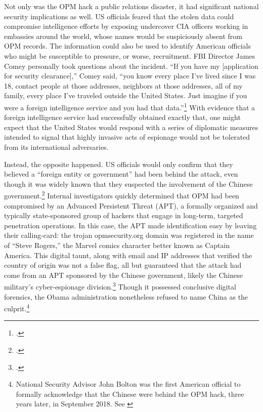 \documentclass[14pt]{extarticle}
\begin{document}
Not only was the OPM hack a public relations disaster, it had significant national security implications as well. US officials feared that the stolen data could compromise intelligence efforts by exposing undercover CIA officers working in embassies around the world, whose names would be suspiciously absent from OPM records. The information could also be used to identify American officials who might be susceptible to pressure, or worse, recruitment. FBI Director James Comey personally took questions about the incident. ``If you have my [application for security clearance],'' Comey said, ``you know every place I've lived since I was 18, contact people at those addresses, neighbors at those addresses, all of my family, every place I've traveled outside the United States. Just imagine if you were a foreign intelligence service and you had that data.''\footcite{nakashima_hacks_2015} With evidence that a foreign intelligence service had successfully obtained exactly that, one might expect that the United States would respond with a series of diplomatic measures intended to signal that highly invasive acts of espionage would not be tolerated from its international adversaries.

Instead, the opposite happened. US officials would only confirm that they believed a \enquote{foreign entity or government} had been behind the attack, even though it was widely known that they suspected the involvement of the Chinese government.\footcite{spetalnick_china_2015} Internal investigators quickly determined that OPM had been compromised by an Advanced Persistent Threat (APT), a formally organized and typically state-sponsored group of hackers that engage in long-term, targeted penetration operations. In this case, the APT made identification easy by leaving their calling-card: the trojan opmsecurity.org domain was registered in the name of \enquote{Steve Rogers,} the Marvel comics character better known as Captain America. This digital taunt, along with email and IP addresses that verified the country of origin was not a false flag, all but guaranteed that the attack had come from an APT sponsored by the Chinese government, likely the Chinese military's cyber-espionage division.\footcite{koerner_inside_2016} Though it possessed conclusive digital forensics, the Obama administration nonetheless refused to name China as the culprit.\footnote{National Security Advisor John Bolton was the first American official to formally acknowledge that the Chinese were behind the OPM hack, three years later, in September 2018. See \cite{sanger_trump_2018}}
\end{document}
